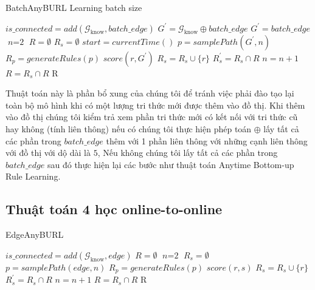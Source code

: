 \begin{algorithm}
	\caption{BatchAnyBURL Learning batch size}
	\label{alg:BatchAnyBURL}
	\begin{algorithmic}[1]
		\State $is\_connected = add(\mathcal{G}_{\text{know}}, batch\_edge)$
		\State  $ G^{\prime} = \mathcal{G}_{\text{know}} \oplus batch\_edge$
		\Else
		\State  $ G^{\prime} = batch\_edge$
		\EndIf
		\State $\textit{n} = \text{2}$
		\State $R = \emptyset$
		\Loop
		\State $R_s = \emptyset$
		\State $start = currentTime()$
		\Repeat
		\State $p = samplePath(G^{\prime}, n)$
		\State $R_p = generateRules(p)$
		\State $score(r, G^{\prime})$
		\State $R_s = R_s \cup \{r\}$
		\EndIf
		\EndFor
		\State $R^{\prime}_s = R_s \cap R$
		\State $n = n + 1$
		\EndIf
		\State $R = R_s \cap R$
		\EndLoop
		\Return R
		\EndProcedure
	\end{algorithmic}
\end{algorithm}

Thuật toán này là phần bổ xung của chúng tôi để tránh việc phải đào tạo lại toàn bộ mô hình khi có một lượng tri thức mới được thêm vào đồ thị. Khi thêm vào đồ thị chúng tôi kiểm trả xem phần tri thức mới có kết nối với tri thức cũ hay không (tính liên thông) nếu có chúng tôi thực hiện phép toán \(\oplus\) lấy  tất cả các phần trong \(batch\_edge\) thêm với 1 phần liên thông với những cạnh liên thông với đồ thị với dộ dài là \(5\), Nếu không chúng tôi lấy tất cả các phần trong \(batch\_edge\) sau đó thực hiện lại các bước như thuật toán Anytime Bottom-up Rule Learning.

\subsection{Thuật toán 4 học online-to-online}


\begin{algorithm}[H]
	\caption{EdgeAnyBURL}
	\label{alg:EdgeAnyBURL}
	\begin{algorithmic}[1]
		\State $is\_connected = add(\mathcal{G}_{\text{know}}, edge)$
		\State $R = \emptyset$
		\State $\textit{n} = \text{2}$
		\State $R_s = \emptyset$
		\Repeat
		\State $p = samplePath(edge, n)$
		\State $R_p = generateRules(p)$
		\State $score(r, s)$
		\State $R_s = R_s \cup \{r\}$
		\EndIf
		\EndFor
		\State $R^{\prime}_s = R_s \cap R$
		\State $n = n + 1$
		\EndIf
		\State $R = R_s \cap R$
		\EndIf
		\State \Return R
		\EndProcedure
	\end{algorithmic}
\end{algorithm}

